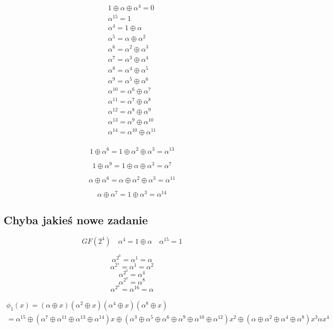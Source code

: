 \documentclass[12pt]{article}
\begin{document}
\begin{multline*}
     1 \oplus \alpha \oplus  \alpha^4  = 0 \\
     \alpha^{15}  =1 \\
     \alpha^4  = 1 \oplus \alpha \\
     \alpha^5 = \alpha \oplus \alpha^2 \\
     \alpha^6 = \alpha^2 \oplus \alpha^3 \\
     \alpha^7 = \alpha^3 \oplus \alpha^4 \\
     \alpha^8 = \alpha^4 \oplus \alpha^5 \\
     \alpha^9 = \alpha^5 \oplus \alpha^6 \\
     \alpha^{10} = \alpha^6 \oplus \alpha^7 \\
     \alpha^{11} = \alpha^7 \oplus \alpha^8 \\
     \alpha^{12} = \alpha^8 \oplus \alpha^9 \\
     \alpha^{13} = \alpha^9 \oplus \alpha^{10} \\
     \alpha^{14} = \alpha^{10} \oplus \alpha^{11} \\
\end{multline*}

$$
     1 \oplus \alpha^6 = 1\oplus \alpha^2\oplus\alpha^3 = \alpha^{13}
$$

$$
     1 \oplus \alpha^9 = 1 \oplus \alpha\oplus\alpha^3=\alpha^7
$$

$$\alpha \oplus \alpha^6 = \alpha \oplus \alpha^2\oplus\alpha^3=\alpha^{11} $$

$$\alpha \oplus \alpha ^7 = 1\oplus\alpha^3=\alpha^14 $$

\subsection*{Chyba jakieś nowe zadanie} 

$$GF(2^4) \quad \alpha^4 = 1\oplus\alpha \quad \alpha^{15} = 1 $$


$$\alpha^{2^0} = \alpha^1 = \alpha $$
$$\alpha^{2^1} = \alpha^1 = \alpha^2 $$
$$\alpha^{2^2} = \alpha^4  $$
$$\alpha^{2^3} = \alpha^8  $$
$$\alpha^{2^4} = \alpha^{16} = \alpha  $$

\begin{multline*}
    \phi_1 (x) = (\alpha \oplus x)(\alpha^2 \oplus x)(\alpha^4 \oplus x)(\alpha^8 \oplus x) \\ 
    =\alpha^{15} \oplus (\alpha^7 \oplus \alpha^11 \oplus \alpha^{13} \oplus \alpha^{14})x 
    \oplus (\alpha^3 \oplus \alpha ^5 \oplus \alpha^6 \oplus \alpha^9 \oplus \alpha^{10} \oplus \alpha^{12})x^2
    \oplus (\alpha \oplus \alpha^2 \oplus \alpha^4 \oplus \alpha^8)x^3 \alpha x^4 
\end{multline*}
\end{document}
